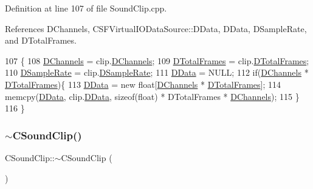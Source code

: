 Definition at line 107 of file Sound\+Clip.\+cpp.



References D\+Channels, C\+S\+F\+Virtual\+I\+O\+Data\+Source\+::\+D\+Data, D\+Data, D\+Sample\+Rate, and D\+Total\+Frames.


\begin{DoxyCode}
107                                             \{
108     \hyperlink{classCSoundClip_a01aaf0b87b9b8226c77a6931d03d6a64}{DChannels} = clip.\hyperlink{classCSoundClip_a01aaf0b87b9b8226c77a6931d03d6a64}{DChannels};
109     \hyperlink{classCSoundClip_ab0d9eb261d09fa2a106658276f37285b}{DTotalFrames} = clip.\hyperlink{classCSoundClip_ab0d9eb261d09fa2a106658276f37285b}{DTotalFrames};
110     \hyperlink{classCSoundClip_ac1b9306140da2f89f6178833e0a9b887}{DSampleRate} = clip.\hyperlink{classCSoundClip_ac1b9306140da2f89f6178833e0a9b887}{DSampleRate};
111     \hyperlink{classCSoundClip_a220921a0c81e5c63e2cd3c55c75878b1}{DData} = NULL;
112     \textcolor{keywordflow}{if}(\hyperlink{classCSoundClip_a01aaf0b87b9b8226c77a6931d03d6a64}{DChannels} * \hyperlink{classCSoundClip_ab0d9eb261d09fa2a106658276f37285b}{DTotalFrames})\{
113         \hyperlink{classCSoundClip_a220921a0c81e5c63e2cd3c55c75878b1}{DData} = \textcolor{keyword}{new} \textcolor{keywordtype}{float}[\hyperlink{classCSoundClip_a01aaf0b87b9b8226c77a6931d03d6a64}{DChannels} * \hyperlink{classCSoundClip_ab0d9eb261d09fa2a106658276f37285b}{DTotalFrames}];
114         memcpy(\hyperlink{classCSoundClip_a220921a0c81e5c63e2cd3c55c75878b1}{DData}, clip.\hyperlink{classCSoundClip_a220921a0c81e5c63e2cd3c55c75878b1}{DData}, \textcolor{keyword}{sizeof}(\textcolor{keywordtype}{float}) * DTotalFrames * 
      \hyperlink{classCSoundClip_a01aaf0b87b9b8226c77a6931d03d6a64}{DChannels});
115     \}
116 \}
\end{DoxyCode}
\hypertarget{classCSoundClip_a9c1ae390d4509c4d39610a624c2f61f5}{}\label{classCSoundClip_a9c1ae390d4509c4d39610a624c2f61f5} 
\subsubsection{\texorpdfstring{$\sim$\+C\+Sound\+Clip()}{~CSoundClip()}}
{\footnotesize\ttfamily C\+Sound\+Clip\+::$\sim$\+C\+Sound\+Clip (\begin{DoxyParamCaption}{ }\end{DoxyParamCaption})}



